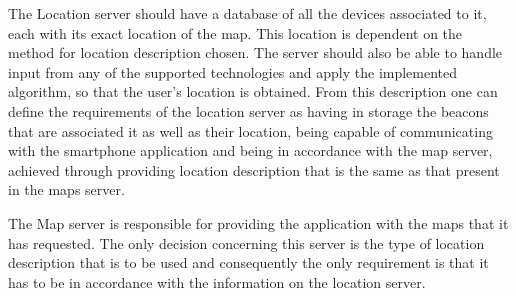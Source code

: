  
The Location server should have a database of all the devices associated to it, each with its exact location of the map. This location is dependent on the method for location description chosen. The server should also be able to handle input from any of the supported technologies and apply the implemented algorithm, so that the user's location is obtained. From this description one can define the requirements of the location server as having in storage the beacons that are associated it as well as their location, being capable of communicating with the smartphone application and being in accordance with the map server, achieved through providing location description that is the same as that present in the maps server. 
 
 
The Map server is responsible for providing the application with the maps that it has requested. The only decision concerning this server is the type of location description that is to be used and consequently the only requirement is that it has to be in accordance with the information on the location server. 
 